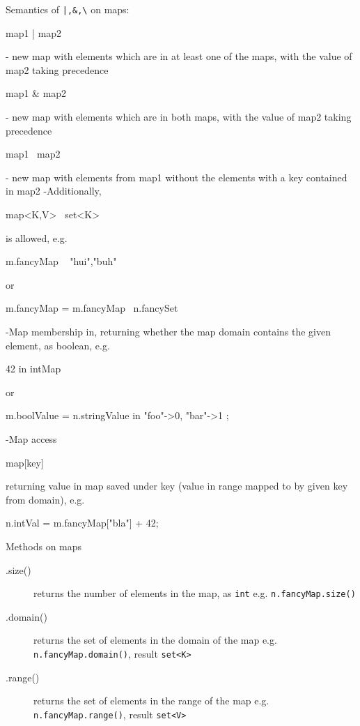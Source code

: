 Semantics of \verb#|,&,\# on maps:
\begin{grgenlet}
map1 | map2
\end{grgenlet}
 - new map with elements which are in at least one of the maps, with the value of map2 taking precedence
\begin{grgenlet}
map1 & map2
\end{grgenlet}
- new map with elements which are in both maps, with the value of map2 taking precedence
\begin{grgenlet}
map1 \ map2
\end{grgenlet}
- new map with elements from map1 without the elements with a key contained in map2
-Additionally, 
\begin{grgenlet}
map<K,V> \ set<K>
\end{grgenlet}
is allowed, e.g.
\begin{grgenlet}
m.fancyMap \ { "hui","buh" }
\end{grgenlet} 
or 
\begin{grgenlet}
m.fancyMap = m.fancyMap \ n.fancySet 
\end{grgenlet}
-Map membership in, returning whether the map domain contains the given element, as boolean, e.g. 
\begin{grgenlet}
42 in intMap
\end{grgenlet}  
or  
\begin{grgenlet}
m.boolValue = n.stringValue in { "foo"->0, "bar"->1 };
\end{grgenlet}
-Map access 
\begin{grgenlet}
map[key]
\end{grgenlet}
returning value in map saved under key (value in range mapped to by given key from domain), e.g.
\begin{grgenlet}
n.intVal = m.fancyMap["bla"] + 42;
\end{grgenlet}

Methods on maps
\begin{description}
  \item[.size()] returns the number of elements in the map, as \texttt{int}
 e.g. \texttt{n.fancyMap.size()}
  \item[.domain()] returns the set of elements in the domain of the map
 e.g. \texttt{n.fancyMap.domain()}, result \verb#set<K>#
  \item[.range()] returns the set of elements in the range of the map
 e.g. \texttt{n.fancyMap.range()}, result \verb#set<V>#
\end{description}

